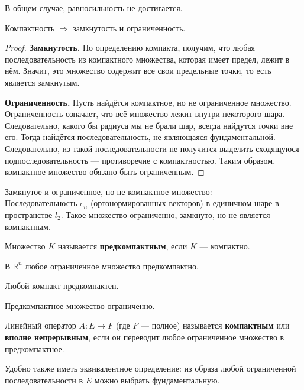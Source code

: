 \documentclass[12pt]{article}
\begin{document}
	В общем случае, равносильность не достигается.
	
	\begin{theorem}
		Компактность $\Rightarrow$ замкнутость и ограниченность.
	\end{theorem}
	\begin{proof}
		\textbf{Замкнутость.} По определению компакта, получим, что любая последовательность из 
		компактного множества, которая имеет предел, лежит в нём. Значит, это множество содержит все свои предельные точки, то есть 
		является замкнутым.
		
		\textbf{Ограниченность.} Пусть найдётся компактное, но не ограниченное множество. Ограниченность означает, что всё множество
		лежит внутри некоторого шара. Следовательно, какого бы радиуса мы не брали шар, всегда найдутся точки вне его. Тогда
		найдётся последовательность, не являющаяся фундаментальной. Следовательно, из такой последовательности не получится выделить
		сходящуюся подпоследовательность --- противоречие с компактностью. Таким образом, компактное множество обязано быть ограниченным.
	\end{proof}
	
	\example Замкнутое и ограниченное, но не компактное множество: \\
	Последовательность $e_n$ (ортонормированных векторов) в единичном шаре в пространстве $l_2$. Такое множество ограниченно, 
	замкнуто, но не является компактным.
	
	\begin{defi}
		Множество $K$ называется \textbf{предкомпактным}, если $\overline{K}$ --- компактно.
	\end{defi}
	
	\example В $\mathbb{R}^n$ любое ограниченное множество предкомпактно.
	
	\example Любой компакт предкомпактен.
	
	\begin{note}
		Предкомпактное множество ограниченно.
	\end{note}
	
	\begin{defi}
		Линейный оператор $A:E \rightarrow F$ (где $F$ --- полное) называется \textbf{компактным} или 
		\textbf{вполне непрерывным}, если он переводит любое ограниченное множество в предкомпактное.
	\end{defi}
	
	Удобно также иметь эквивалентное определение: из образа любой ограниченной последовательности в $E$ можно выбрать 
	фундаментальную.
	
\end{document}
